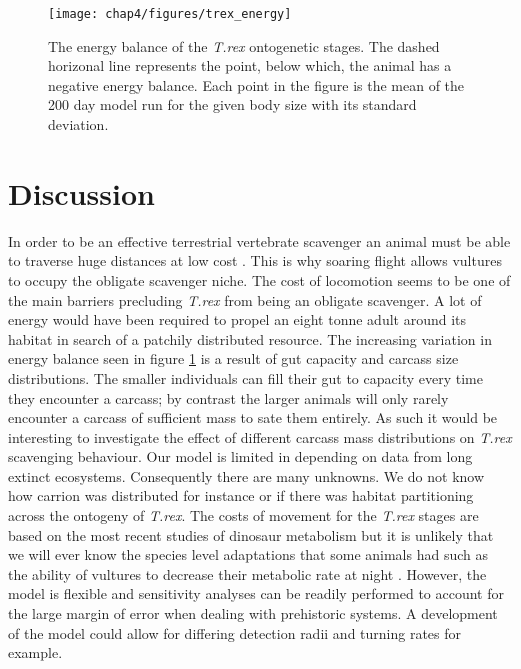 \begin{figure}[H]
\centering
\texttt{[image: chap4/figures/trex\_energy]}
		\caption[\textit{T.rex} energy balance] %
				{The energy balance of the \textit{T.rex} ontogenetic stages. The dashed horizonal line represents the point, below which, the animal has a negative energy balance. Each point in the figure is the mean of the 200 day model run for the given body size with its standard deviation.   
} 
		\label{fig:trex_energy}
	\end{figure}


\section{\uppercase{D}iscussion}
In order to be an effective terrestrial vertebrate scavenger an animal must be able to traverse huge distances at low cost \citep{ruxton2004obligate}. This is why soaring flight allows vultures to occupy the obligate scavenger niche. The cost of locomotion seems to be one of the main barriers precluding \textit{T.rex} from being an obligate scavenger. A lot of energy would have been required to propel an eight tonne adult around its habitat in search of a patchily distributed resource. The increasing variation in energy balance seen in figure \ref{fig:trex_energy} is a result of gut capacity and carcass size distributions. The smaller individuals can fill their gut to capacity every time they encounter a carcass; by contrast the larger animals will only rarely encounter a carcass of sufficient mass to sate them entirely. As such it would be interesting to investigate the effect of different carcass mass distributions on \textit{T.rex} scavenging behaviour. Our model is limited in depending on data from long extinct ecosystems. Consequently there are many unknowns. We do not know how carrion was distributed for instance or if there was habitat partitioning across the ontogeny of \textit{T.rex}. The costs of movement for the \textit{T.rex} stages are based on the most recent studies of dinosaur metabolism \citep{grady2014evidence} but it is unlikely that we will ever know the species level adaptations that some animals had such as the ability of vultures to decrease their metabolic rate at night \citep{ruxton2002modelling}. However, the model is flexible and sensitivity analyses can be readily performed to account for the large margin of error when dealing with prehistoric systems. A development of the model could allow for differing detection radii and turning rates for example.  \\
